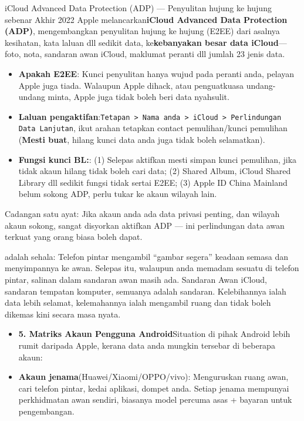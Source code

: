 \begin{tcbwarn}{iCloud Advanced Data Protection (ADP) — Penyulitan hujung ke hujung sebenar}
Akhir 2022 Apple melancarkan\textbf{iCloud Advanced Data Protection (ADP)}, mengembangkan penyulitan hujung ke hujung (E2EE) dari asalnya kesihatan, kata laluan dll sedikit data, ke\textbf{kebanyakan besar data iCloud}— foto, nota, sandaran awan iCloud, maklumat peranti dll jumlah 23 jenis data.

\begin{itemize}
  \item \textbf{Apakah E2EE}: Kunci penyulitan hanya wujud pada peranti anda, pelayan Apple juga tiada. Walaupun Apple dihack, atau penguatkuasa undang-undang minta, Apple juga tidak boleh beri data nyahsulit.
  \item \textbf{Laluan pengaktifan}:\texttt{Tetapan > Nama anda > iCloud > Perlindungan Data Lanjutan}, ikut arahan tetapkan contact pemulihan/kunci pemulihan (\textbf{Mesti buat}, hilang kunci data anda juga tidak boleh selamatkan).
  \item \textbf{Fungsi kunci BL:}: (1) Selepas aktifkan mesti simpan kunci pemulihan, jika tidak akaun hilang tidak boleh cari data; (2) Shared Album, iCloud Shared Library dll sedikit fungsi tidak sertai E2EE; (3) Apple ID China Mainland belum sokong ADP, perlu tukar ke akaun wilayah lain.
\end{itemize}

Cadangan satu ayat: Jika akaun anda ada data privasi penting, dan wilayah akaun sokong, sangat disyorkan aktifkan ADP — ini perlindungan data awan terkuat yang orang biasa boleh dapat.

\end{tcbwarn}


adalah sehala: Telefon pintar mengambil “gambar segera” keadaan semasa dan menyimpannya ke awan. Selepas itu, walaupun anda memadam sesuatu di telefon pintar, salinan dalam sandaran awan masih ada. Sandaran Awan iCloud, sandaran tempatan komputer, semuanya adalah sandaran. Kelebihannya ialah data lebih selamat, kelemahannya ialah mengambil ruang dan tidak boleh dikemas kini secara masa nyata.

\begin{itemize}
  \item \textbf{5. Matriks Akaun Pengguna Android}Situation di pihak Android lebih rumit daripada Apple, kerana data anda mungkin tersebar di beberapa akaun:
  \item \textbf{Akaun jenama}(Huawei/Xiaomi/OPPO/vivo): Menguruskan ruang awan, cari telefon pintar, kedai aplikasi, dompet anda. Setiap jenama mempunyai perkhidmatan awan sendiri, biasanya model percuma asas + bayaran untuk pengembangan.
\end{itemize}

